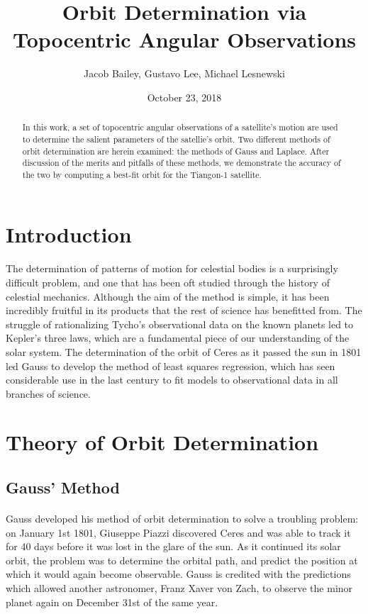\documentclass[11pt,twoside,letterpaper]{article}
\begin{document}
\title{Orbit Determination via Topocentric Angular Observations}
\author{Jacob Bailey, Gustavo Lee, Michael Lesnewski}
\date{October 23, 2018}
\maketitle

  \begin{abstract}
    In this work, a set of topocentric angular observations of a
    satellite's motion are used to determine the salient parameters of
    the satellie's orbit. Two different methods of orbit determination
    are herein examined: the methods of Gauss and Laplace. After
    discussion of the merits and pitfalls of these methods, we
    demonstrate the accuracy of the two by computing a best-fit orbit
    for the Tiangon-1 satellite.
  \end{abstract}

  \section {Introduction}
  \paragraph{}
  The determination of patterns of motion for celestial bodies is a
  surprisingly difficult problem, and one that has been oft studied
  through the history of celestial mechanics. Although the aim of the
  method is simple, it has been incredibly fruitful in its products
  that the rest of science has benefitted from. The struggle of
  rationalizing Tycho's observational data on the known planets led to
  Kepler's three laws, which are a fundamental piece of our
  understanding of the solar system. The determination of the orbit of
  Ceres as it passed the sun in 1801 led Gauss to develop the method
  of least squares regression, which has seen considerable use in the
  last century to fit models to observational data in all branches of
  science.

  
  \section{Theory of Orbit Determination}
  
  \subsection {Gauss' Method}
    
  \paragraph{}
  Gauss developed his method of orbit determination to solve a
  troubling problem: on January 1st 1801, Giuseppe Piazzi discovered
  Ceres and was able to track it for 40 days before it was lost in the
  glare of the sun. As it continued its solar orbit, the problem was
  to determine the orbital path, and predict the position at which it
  would again become observable. Gauss is credited with the
  predictions which allowed another astronomer, Franz Xaver von Zach,
  to observe the minor planet again on December 31st of the same year.
\end{document}
